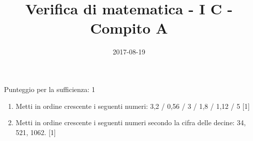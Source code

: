 \documentclass[11pt,fleqn]{article} %
\title{Verifica di matematica - I C - Compito A}
\date{2017-08-19}
\begin{document}
\maketitle
Punteggio per la sufficienza: 1
\begin{enumerate}

\item Metti in ordine crescente i seguenti numeri: 3,2 / 0,56 / 3 / 1,8 / 1,12 / 5 [1] 
\item Metti in ordine crescente i seguenti numeri secondo la cifra delle decine: 34, 521, 1062. [1] 
\end{enumerate}
\end{document}
